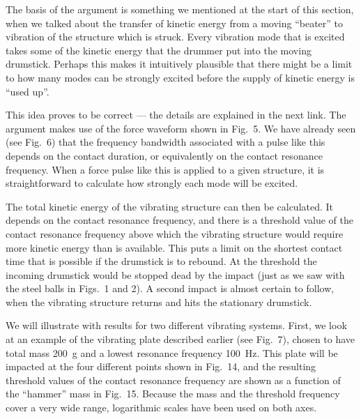   The basis of the argument is something we mentioned at the start of this 
  section, when we talked about the transfer of kinetic energy from a moving 
  “beater” to vibration of the structure which is struck. Every vibration mode 
  that is excited takes some of the kinetic energy that the drummer put into 
  the moving drumstick. Perhaps this makes it intuitively plausible that there 
  might be a limit to how many modes can be strongly excited before the supply 
  of kinetic energy is “used up”. 

  This idea proves to be correct — the details are explained in the next link. 
  The argument makes use of the force waveform shown in Fig.\ 5. We have 
  already seen (see Fig.\ 6) that the frequency bandwidth associated with a 
  pulse like this depends on the contact duration, or equivalently on the 
  contact resonance frequency. When a force pulse like this is applied to a 
  given structure, it is straightforward to calculate how strongly each mode 
  will be excited. 

  The total kinetic energy of the vibrating structure can then be calculated. 
  It depends on the contact resonance frequency, and there is a threshold value 
  of the contact resonance frequency above which the vibrating structure would 
  require more kinetic energy than is available. This puts a limit on the 
  shortest contact time that is possible if the drumstick is to rebound. At the 
  threshold the incoming drumstick would be stopped dead by the impact (just as 
  we saw with the steel balls in Figs.\ 1 and 2). A second impact is almost 
  certain to follow, when the vibrating structure returns and hits the 
  stationary drumstick. 

  We will illustrate with results for two different vibrating systems. First, 
  we look at an example of the vibrating plate described earlier (see Fig.\ 7), 
  chosen to have total mass 200~g and a lowest resonance frequency 100~Hz. This 
  plate will be impacted at the four different points shown in Fig.\ 14, and 
  the resulting threshold values of the contact resonance frequency are shown 
  as a function of the “hammer” mass in Fig.\ 15. Because the mass and the 
  threshold frequency cover a very wide range, logarithmic scales have been 
  used on both axes. 


